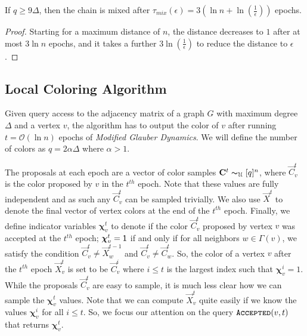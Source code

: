 \begin{theorem}
\label{thm:modified_mixing_time}
If $q\ge 9\Delta$, then the chain is mixed after $\tau_{mix}(\epsilon) = 3\left( \ln n + \ln(\frac1{\epsilon})\right)$ epochs.
\end{theorem}
\begin{proof}
Starting for a maximum distance of $n$, the distance decreases to $1$ after at most $3\ln n$ epochs,
and it takes a further $3\ln\left( \frac{1}{\epsilon} \right)$ to reduce the distance to $\epsilon$.
\end{proof}




\subsection{Local Coloring Algorithm}%
\label{sec:local_coloring_algortihm}
Given query access to the adjacency matrix of a graph $G$ with maximum degree $\Delta$ and a vertex $v$,
the algorithm has to output the color of $v$ after running $t = \mathcal O(\ln n)$ epochs of \emph{Modified Glauber Dynamics}.
We will define the number of colors as $q = 2\alpha\Delta$ where $\alpha > 1$.

The proposals at each epoch are a vector of color samples $\vec C^{t} \thicksim_{\mathcal U} [q]^n$,
where $\vec C^t_v$ is the color proposed by $v$ in the $t^{th}$ epoch.
Note that these values are fully independent and as such any $\vec C^t_v$ can be sampled trivially.
We also use $\vec X^t$ to denote the final vector of vertex colors at the end of the $t^{th}$ epoch.
Finally, we define indicator variables $\bm \chi^t_v$ to denote if the color $\vec C^t_v$ proposed by vertex $v$ was accepted at the $t^{th}$ epoch;
$\bm \chi^t_v = \ONE$ if and only if for all neighbors $w\in \Gamma(v)$,
we satisfy the condition $\vec C^t_v\not= \vec X^{t-1}_w$ and $\vec C^t_v\not= \vec C^t_w$.
So, the color of a vertex $v$ after the $t^{th}$ epoch $\vec X^t_v$ is set to be $\vec C^i_v$
where $i\le t$ is the largest index such that $\bm \chi^i_v=1$.
While the proposals $\vec C^t_v$ are easy to sample, it is much less clear how we can sample the $\bm \chi^t_v$ values.
Note that we can compute $\vec X^t_v$ quite easily if we know the values $\bm\chi^i_v$ for all $i\le t$.
So, we focus our attention on the query $\func{Accepted}(v,t)$ that returns $\bm\chi^t_v$.


